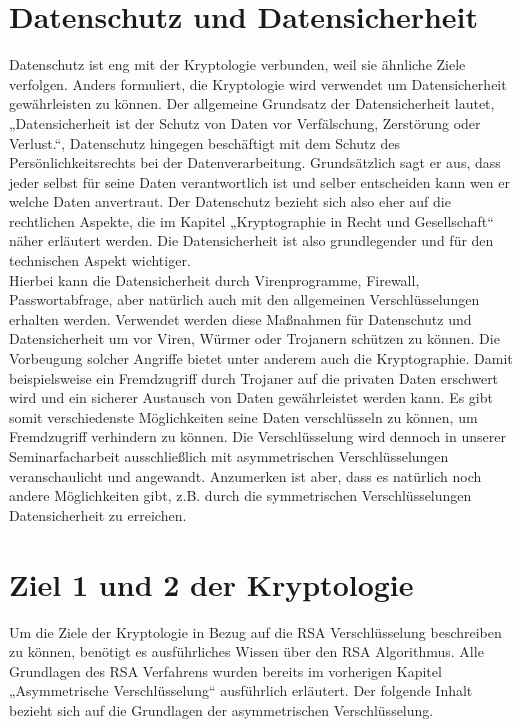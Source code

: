 \section{Datenschutz und Datensicherheit}
Datenschutz ist eng mit der Kryptologie verbunden, weil sie ähnliche Ziele verfolgen. Anders formuliert, die Kryptologie wird verwendet um Datensicherheit gewährleisten zu können. Der allgemeine Grundsatz der Datensicherheit lautet, „Datensicherheit ist der Schutz von Daten vor Verfälschung, Zerstörung oder Verlust.“, Datenschutz hingegen beschäftigt mit dem Schutz des Persönlichkeitsrechts bei der Datenverarbeitung. Grundsätzlich sagt er aus, dass jeder selbst für seine Daten verantwortlich ist und selber entscheiden kann wen er welche Daten anvertraut. Der Datenschutz bezieht sich also eher auf die rechtlichen Aspekte, die im Kapitel „Kryptographie in Recht und Gesellschaft“ näher erläutert werden. Die Datensicherheit ist also grundlegender und für den technischen Aspekt wichtiger.\\

Hierbei kann die Datensicherheit durch Virenprogramme, Firewall, Passwortabfrage, aber natürlich auch mit den allgemeinen Verschlüsselungen erhalten werden. Verwendet werden diese Maßnahmen für Datenschutz und Datensicherheit um vor Viren, Würmer oder Trojanern schützen zu können. Die Vorbeugung solcher Angriffe bietet unter anderem auch die Kryptographie. Damit beispielsweise ein Fremdzugriff durch Trojaner auf die privaten Daten erschwert wird und ein sicherer Austausch von Daten gewährleistet werden kann. Es gibt somit verschiedenste Möglichkeiten seine Daten verschlüsseln zu können, um Fremdzugriff verhindern zu können. Die Verschlüsselung wird dennoch in unserer Seminarfacharbeit ausschließlich mit asymmetrischen Verschlüsselungen veranschaulicht und angewandt. Anzumerken ist aber, dass es natürlich noch andere Möglichkeiten gibt, z.B. durch die symmetrischen Verschlüsselungen Datensicherheit zu erreichen. \cite{Sicherheit}\\

\section{Ziel 1 und 2 der Kryptologie}
Um die Ziele der Kryptologie in Bezug auf die RSA Verschlüsselung beschreiben zu können, benötigt es ausführliches Wissen über den RSA Algorithmus. Alle Grundlagen des RSA Verfahrens wurden bereits im vorherigen Kapitel „Asymmetrische Verschlüsselung“ ausführlich erläutert. Der folgende Inhalt bezieht sich auf die Grundlagen der asymmetrischen Verschlüsselung.\\


